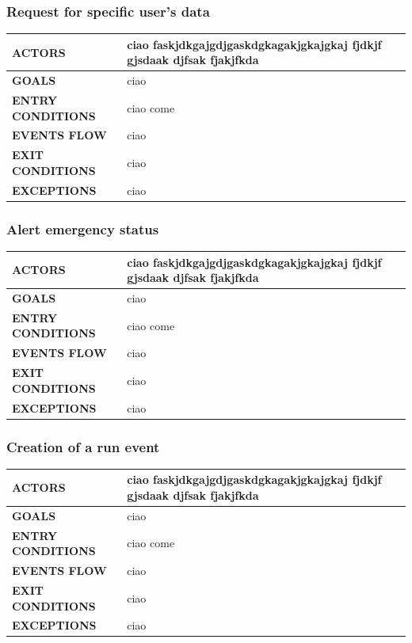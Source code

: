 \documentclass[a4paper]{article}
\begin{document}
\subsubsection{Request for specific user's data}
\begin{center}
    \begin{tabular}{l || p{6cm} ||}
        \bf{ACTORS} & ciao faskjdkgajgdjgaskdgkagakjgkajgkaj fjdkjf gjsdaak djfsak fjakjfkda \\ \hline
        \bf{GOALS} & ciao \\ \hline
        \bf{ENTRY CONDITIONS} & ciao come  \\ \hline
        \bf{EVENTS FLOW} & ciao\\ \hline
        \bf{EXIT CONDITIONS} & ciao\\ \hline
        \bf{EXCEPTIONS} & ciao\\ \hline \hline
    \end{tabular}
\end{center}

\vspace{1cm}

\subsubsection{Alert emergency status}
\begin{center}
    \begin{tabular}{l || p{6cm} ||}
        \bf{ACTORS} & ciao faskjdkgajgdjgaskdgkagakjgkajgkaj fjdkjf gjsdaak djfsak fjakjfkda \\ \hline
        \bf{GOALS} & ciao \\ \hline
        \bf{ENTRY CONDITIONS} & ciao come  \\ \hline
        \bf{EVENTS FLOW} & ciao\\ \hline
        \bf{EXIT CONDITIONS} & ciao\\ \hline
        \bf{EXCEPTIONS} & ciao\\ \hline \hline
    \end{tabular}
\end{center}

\vspace{1cm}

\subsubsection{Creation of a run event}
\begin{center}
    \begin{tabular}{l || p{6cm} ||}
        \bf{ACTORS} & ciao faskjdkgajgdjgaskdgkagakjgkajgkaj fjdkjf gjsdaak djfsak fjakjfkda \\ \hline
        \bf{GOALS} & ciao \\ \hline
        \bf{ENTRY CONDITIONS} & ciao come  \\ \hline
        \bf{EVENTS FLOW} & ciao\\ \hline
        \bf{EXIT CONDITIONS} & ciao\\ \hline
        \bf{EXCEPTIONS} & ciao\\ \hline \hline
    \end{tabular}
\end{center}
\end{document}
